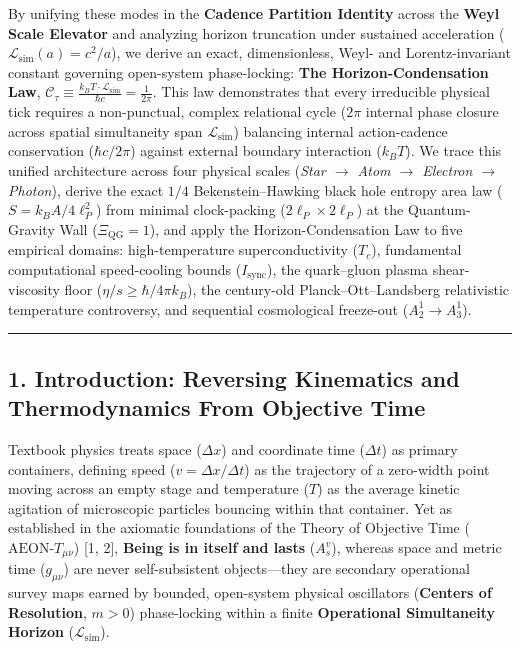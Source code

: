 \documentclass[
]{article}
\begin{document}
By unifying these modes in the \textbf{Cadence Partition Identity}
across the \textbf{Weyl Scale Elevator} and analyzing horizon truncation
under sustained acceleration
(\(\mathcal{L}_{\mathrm{sim}}(a) = c^2/a\)), we derive an exact,
dimensionless, Weyl- and Lorentz-invariant constant governing
open-system phase-locking: \textbf{The Horizon-Condensation Law},
\(\mathcal{C}_\tau \equiv \frac{k_B T \cdot \mathcal{L}_{\mathrm{sim}}}{\hbar c} = \frac{1}{2\pi}\).
This law demonstrates that every irreducible physical tick requires a
non-punctual, complex relational cycle (\(2\pi\) internal phase closure
across spatial simultaneity span \(\mathcal{L}_{\mathrm{sim}}\))
balancing internal action-cadence conservation (\(\hbar c / 2\pi\))
against external boundary interaction (\(k_B T\)). We trace this unified
architecture across four physical scales (\emph{Star \(\to\) Atom
\(\to\) Electron \(\to\) Photon}), derive the exact \(1/4\)
Bekenstein--Hawking black hole entropy area law
(\(S = k_B A / 4\ell_P^2\)) from minimal clock-packing
(\(2\ell_P \times 2\ell_P\)) at the Quantum-Gravity Wall
(\(\Xi_{\mathrm{QG}} = 1\)), and apply the Horizon-Condensation Law to
five empirical domains: high-temperature superconductivity (\(T_c\)),
fundamental computational speed-cooling bounds (\(I_{\mathrm{sync}}\)),
the quark--gluon plasma shear-viscosity floor
(\(\eta/s \ge \hbar/4\pi k_B\)), the century-old Planck--Ott--Landsberg
relativistic temperature controversy, and sequential cosmological
freeze-out (\(A_2^1 \to A_3^1\)).

\begin{center}\rule{0.5\linewidth}{0.5pt}\end{center}

\subsection{1. Introduction: Reversing Kinematics and Thermodynamics
From Objective
Time}\label{introduction-reversing-kinematics-and-thermodynamics-from-objective-time}

Textbook physics treats space (\(\Delta x\)) and coordinate time
(\(\Delta t\)) as primary containers, defining speed
(\(v = \Delta x / \Delta t\)) as the trajectory of a zero-width point
moving across an empty stage and temperature (\(T\)) as the average
kinetic agitation of microscopic particles bouncing within that
container. Yet as established in the axiomatic foundations of the Theory
of Objective Time (\(\text{AEON-}T_{\mu\nu}\)) {[}1, 2{]}, \textbf{Being
is in itself and lasts} (\(A_s^v\)), whereas space and metric time
(\(g_{\mu\nu}\)) are never self-subsistent objects---they are secondary
operational survey maps earned by bounded, open-system physical
oscillators (\textbf{Centers of Resolution}, \(m > 0\)) phase-locking
within a finite \textbf{Operational Simultaneity Horizon}
(\(\mathcal{L}_{\mathrm{sim}}\)).
\end{document}
